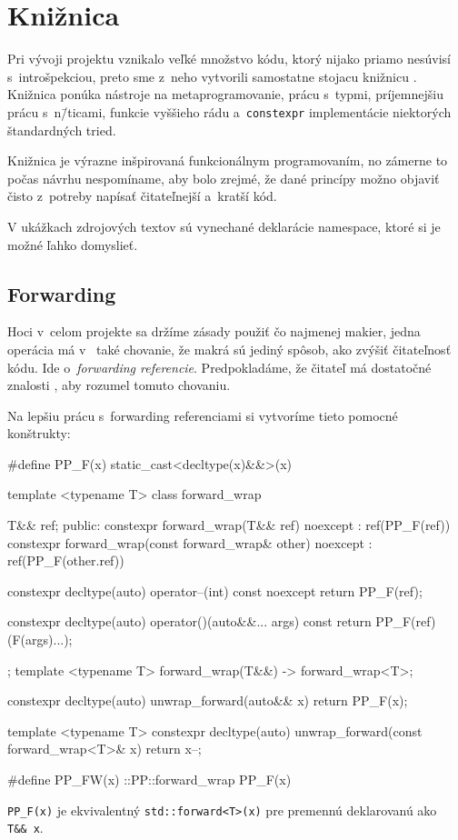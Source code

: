 \chapter{Knižnica \PP} \label{PP}

Pri vývoji projektu vznikalo veľké množstvo kódu, ktorý nijako priamo nesúvisí s~introšpekciou, preto sme z~neho vytvorili samostatne stojacu knižnicu \PP{}. Knižnica ponúka nástroje na metaprogramovanie, prácu s~typmi, príjemnejšiu prácu s~n\=/ticami, funkcie vyššieho rádu a~\texttt{constexpr} implementácie niektorých štandardných tried.

Knižnica je výrazne inšpirovaná funkcionálnym programovaním, no zámerne to počas návrhu nespomíname, aby bolo zrejmé, že dané princípy možno objaviť čisto z~potreby napísať čitateľnejší a~kratší kód.

V ukážkach zdrojových textov sú vynechané deklarácie namespace, ktoré si je možné ľahko domyslieť.

\section{Forwarding}

Hoci v~celom projekte sa držíme zásady použiť čo najmenej makier, jedna operácia má v~\Cpp{} také chovanie, že makrá sú jediný spôsob, ako zvýšiť čitateľnosť kódu. Ide o~\emph{forwarding referencie}. Predpokladáme, že čitateľ má dostatočné znalosti \Cpp{}, aby rozumel tomuto chovaniu.

Na lepšiu prácu s~forwarding referenciami si vytvoríme tieto pomocné konštrukty:
\begin{code}[fontsize=\footnotesize]
#define PP_F(x) static_cast<decltype(x)&&>(x)

template <typename T> class forward_wrap
{   T&& ref;
public:
    constexpr forward_wrap(T&& ref) noexcept
        : ref(PP_F(ref)) {}
    constexpr forward_wrap(const forward_wrap& other) noexcept
        : ref(PP_F(other.ref)) {}
	
    constexpr decltype(auto) operator--(int) const noexcept
    { return PP_F(ref); }
    
    constexpr decltype(auto) operator()(auto&&... args) const
    { return PP_F(ref)(F(args)...); }
};
template <typename T> forward_wrap(T&&) -> forward_wrap<T>;

constexpr decltype(auto) unwrap_forward(auto&& x) { return PP_F(x); }

template <typename T>
constexpr decltype(auto) unwrap_forward(const forward_wrap<T>& x)
{ return x--; }

#define PP_FW(x) ::PP::forward_wrap{ PP_F(x) }
\end{code}
\texttt{PP\_F(x)} je ekvivalentný \texttt{std::forward<T>(x)} pre premennú deklarovanú ako \texttt{T\&\&~x}.

